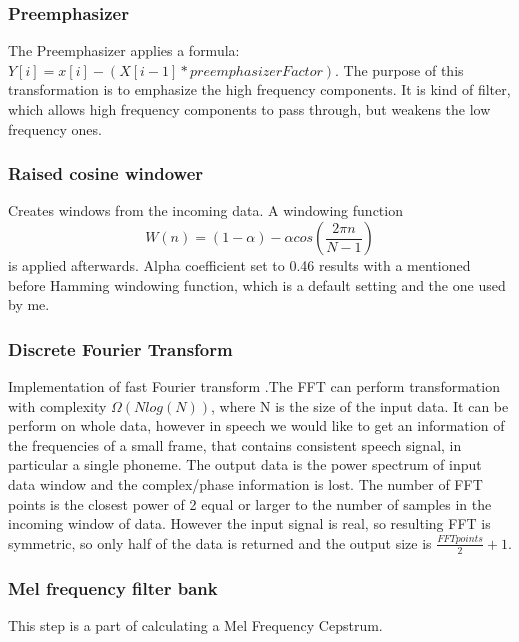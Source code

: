 \documentclass[12pt,a4paper,english]{article}
\begin{document}
\subsubsection{Preemphasizer}

The Preemphasizer applies a formula: $Y[i]=x[i]-(X[i-1] * preemphasizerFactor)$.
The purpose of this transformation is to emphasize the high frequency components. It is kind of filter,
which allows high frequency components to pass through, but weakens the low frequency ones.


\newpage
\subsubsection{Raised cosine windower}

Creates windows from the incoming data. A windowing function
\begin{equation}
    W(n)=(1-\alpha) - \alpha cos(\frac{2 \pi n}{N - 1})
\end{equation}
 is applied afterwards. Alpha coefficient set to 0.46 results with a mentioned before Hamming windowing
 function, which is a default setting and the one used by me.

\subsubsection{Discrete Fourier Transform}

Implementation of fast Fourier transform .The FFT can perform transformation with complexity $\Omega(Nlog(N))$,
where N is the size of the input data.
It can be perform on whole data, however in speech we would like to get an information of the frequencies 
of a small frame, that contains consistent speech signal, in particular a single phoneme.
The output data is the power spectrum of input data window and the complex/phase information is lost.
The number of FFT points is the closest power of 2 equal or larger to the number of samples in the incoming window of data. However the input signal is real, so resulting FFT is symmetric, so only half of the data is returned and the output size is $\frac{FFT points}{2} + 1$.

\subsubsection{Mel frequency filter bank}

This step is a part of calculating a Mel Frequency Cepstrum. \newline
\end{document}
